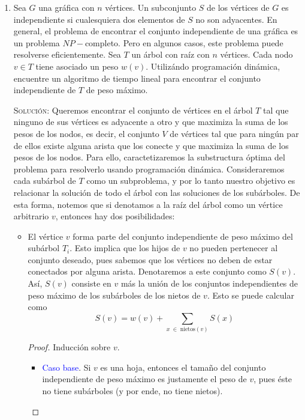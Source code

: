 \documentclass[letterpaper,11pt]{article}
\begin{document}
\begin{enumerate}
    \item Sea $G$ una gráfica con $n$ vértices. Un subconjunto $S$ de los 
    vértices de $G$ es independiente si cualesquiera dos elementos de $S$ no 
    son adyacentes. En general, el problema de encontrar el conjunto 
    independiente de una gráfica es un problema $NP-$completo. Pero en 
    algunos casos, este problema puede resolverse eficientemente. Sea $T$ un
    árbol con raíz con $n$ vértices. Cada nodo $v \in T$ tiene asociado un peso 
    $w(v)$. Utilizándo programación dinámica, encuentre un algoritmo de tiempo 
    lineal para encontrar el conjunto independiente de $T$ de peso máximo.

    \textsc{Solución:} Queremos encontrar el conjunto de vértices en el árbol 
    $T$ tal que ninguno de sus vértices es adyacente a otro y que maximiza la 
    suma de los pesos de los nodos, es decir, el conjunto $V$ de vértices tal 
    que para ningún par de ellos existe alguna arista que los conecte y que 
    maximiza la suma de los pesos de los nodos. Para ello, caractetizaremos la 
    substructura óptima del problema para resolverlo usando programación 
    dinámica. Consideraremos cada subárbol de $T$ como un subproblema, y por 
    lo tanto nuestro objetivo es relacionar la solución de todo el árbol con 
    las soluciones de los subárboles. De esta forma, notemos que si denotamos 
    a la raíz del árbol como un vértice arbitrario $v$, entonces hay dos 
    posibilidades:
    \begin{itemize}
        \item El vértice $v$ forma parte del conjunto independiente de peso 
        máximo del subárbol $T_i$. Esto implica que los hijos de $v$ no pueden
        pertenecer al conjunto deseado, pues sabemos que los vértices no deben 
        de estar conectados por alguna arista. Denotaremos a este conjunto como 
        $S(v)$. Así, $S(v)$ consiste en $v$ más la unión de los conjuntos 
        independientes de peso máximo de los subárboles de los nietos de $v$. 
        Esto se puede calcular como 
        \begin{equation*}
            S(v) = w(v) + \sum_{x \; \in \; \text{nietos}(v)} S(x)
        \end{equation*}

        \begin{proof}
            Inducción sobre $v$.
            \begin{itemize}
                \item \textcolor{blue}{Caso base}. Si $v$ es una hoja, entonces 
                el tamaño del conjunto independiente de peso máximo es justamente 
                el peso de $v$, pues éste no tiene subárboles (y por ende, no 
                tiene nietos).


\end{itemize}
\end{proof}
\end{itemize}
\end{enumerate}
\end{document}
